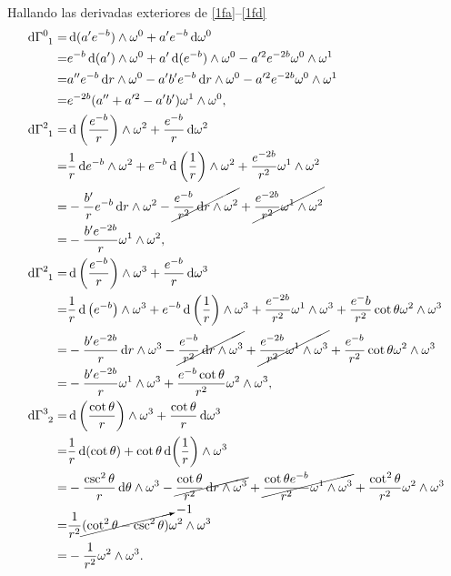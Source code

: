 Hallando las derivadas exteriores de \eqref{1fa}--\eqref{1fd} 
\begingroup
\allowdisplaybreaks
\begin{subequations}
    \begin{align}
        \dd{\tensor{\Gamma}{^0_1}} =& \dd{(a^\prime e^{-b})}\wedge\omega^0 + a^\prime e^{-b}\dd{\omega^0} \nonumber \\
        =& e^{-b}\dd{(a^\prime)}\wedge\omega^0 + a^\prime \dd{(e^{-b})}\wedge\omega^0-a^{\prime 2} e^{-2b}\omega^0\wedge\omega^1 \nonumber \\
        =& a^{\prime\prime} e^{-b} \dd{r}\wedge\omega^0 -a^{\prime}b^{\prime}e^{-b}\dd{r}\wedge\omega^0-a^{\prime 2}e^{-2b}\omega^0\wedge\omega^1 \nonumber \\
        =& e^{-2b}(a^{\prime\prime}+a^{\prime 2}-a^\prime b^\prime) \omega^1 \wedge \omega^0, \\
        \dd{\tensor{\Gamma}{^2_1}} =& \dd{\left(\frac{e^{-b}}{r}\right)}\wedge\omega^2 + \frac{e^{-b}}{r}\dd{\omega^2} \nonumber \\
        =& \frac{1}{r}\dd{e^{-b}}\wedge\omega^2 + e^{-b} \dd{\left(\frac{1}{r}\right)}\wedge\omega^2 + \frac{e^{-2b}}{r^2}\omega^1 \wedge \omega^2 \nonumber \\
        =& -\frac{b^\prime}{r}e^{-b}\dd{r}\wedge\omega^2 -\cancel{\frac{e^{-b}}{r^2}\dd{r}\wedge\omega^2} +\cancel{\frac{e^{-2b}}{r^2}\omega^1\wedge\omega^2} \nonumber \\
        =& - \frac{b^\prime e^{-2b}}{r} \omega^1 \wedge \omega^2, \\
        \dd{\tensor{\Gamma}{^2_1}} =& \dd{\left(\frac{e^{-b}}{r}\right)}\wedge\omega^3 + \frac{e^{-b}}{r}\dd{\omega^3} \nonumber \\
        =& \frac{1}{r}\dd{\left(e^{-b}\right)}\wedge\omega^3 + e^{-b}\dd{\left(\frac{1}{r}\right)}\wedge\omega^3+\frac{e^{-2b}}{r^2}\omega^1\wedge\omega^3 + \frac{e^-b}{r^2}\cot{\theta}\omega^2\wedge\omega^3 \nonumber \\
        =& -\frac{b^\prime e^{-2b}}{r}\dd{r}\wedge\omega^3-\cancel{\frac{e^{-b}}{r^2}\dd{r}\wedge\omega^3} + \cancel{\frac{e^{-2b}}{r^2}\omega^1\wedge\omega^3}+\frac{e^{-b}}{r^2}\cot{\theta}\omega^2\wedge\omega^3 \nonumber \\
        =& -\frac{b^\prime e^{-2b}}{r}\omega^1\wedge\omega^3 + \frac{e^{-b}\cot{\theta}}{r^2}\omega^2\wedge\omega^3, \\
        \dd{\tensor{\Gamma}{^3_2}}=& \dd{\left( \frac{\cot{\theta}}{r} \right)}\wedge\omega^3 + \frac{\cot{\theta}}{r}\dd{\omega^3} \nonumber \\ 
        =& \frac{1}{r}\dd{\qty(\cot{\theta})}+\cot{\theta}\dd{\qty(\frac{1}{r})}\wedge\omega^3 \nonumber \\
        =& -\frac{\csc^2{\theta}}{r}\dd{\theta}\wedge\omega^3 -\cancel{ \frac{\cot{\theta}}{r^2}\dd{r}\wedge\omega^3}+\cancel{\frac{\cot{\theta}e^{-b}}{r^2}\omega^1\wedge\omega^3}+\frac{\cot^2{\theta}}{r^2}\omega^2\wedge\omega^3 \nonumber \\
        =& \frac{1}{r^2}\cancelto{-1}{(\cot^2{\theta}-\csc^2{\theta})}\omega^2\wedge\omega^3 \nonumber \\
        =& -\frac{1}{r^2}\omega^2\wedge\omega^3.
    \end{align}
\end{subequations}

